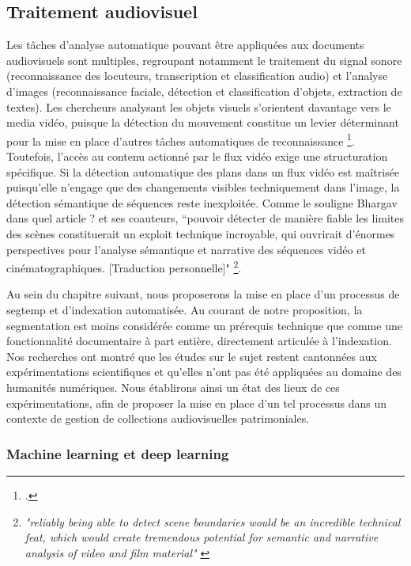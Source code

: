 \subsection{Traitement audiovisuel}

Les tâches d’analyse automatique pouvant être appliquées aux documents audiovisuels sont multiples, regroupant notamment le traitement du signal sonore (reconnaissance des locuteurs, transcription et classification audio) et l’analyse d’images (reconnaissance faciale, détection et classification d’objets, extraction de textes). Les chercheurs analysant les objets visuels s’orientent davantage vers le media vidéo, puisque la détection du mouvement constitue un levier déterminant pour la mise en place d’autres tâches automatiques de reconnaissance \footcite{brostow2009}. Toutefois, l’accès au contenu actionné par le flux vidéo exige une structuration spécifique. Si la détection automatique des plans dans un flux vidéo est maîtrisée puisqu’elle n’engage que des changements visibles techniquement dans l’image, la détection sémantique de séquences reste inexploitée. Comme le souligne Bhargav dans quel article ? et ses coauteurs, “pouvoir détecter de manière fiable les limites des scènes constituerait un exploit technique incroyable, qui ouvrirait d'énormes perspectives pour l'analyse sémantique et narrative des séquences vidéo et cinématographiques. [Traduction personnelle]" \footnote{\textit{"reliably being able to detect scene boundaries would be an incredible technical feat, which would create tremendous potential for semantic and narrative analysis of video and film material"} \cite{bhargav2019}}.

Au sein du chapitre suivant, nous proposerons la mise en place d’un processus de \gls{segtemp} et d’indexation automatisée. Au courant de notre proposition, la segmentation est moins considérée comme un prérequis technique que comme une fonctionnalité documentaire à part entière, directement articulée à l’indexation. Nos recherches ont montré que les études sur le sujet restent cantonnées aux expérimentations scientifiques et qu'elles n'ont pas été appliquées au domaine des humanités numériques. Nous établirons ainsi un état des lieux de ces expérimentations, afin de proposer la mise en place d'un tel processus dans un contexte de gestion de collections audiovisuelles patrimoniales.    


\subsubsection{Machine learning et deep learning}


